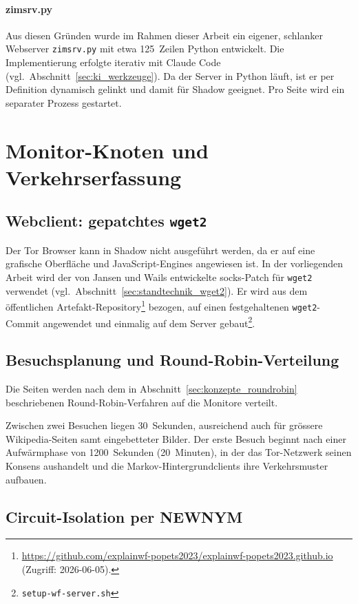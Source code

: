 \paragraph{zimsrv.py}
Aus diesen Gründen wurde im Rahmen dieser Arbeit ein eigener, schlanker Webserver \texttt{zimsrv.py} mit etwa 125~Zeilen Python entwickelt.
Die Implementierung erfolgte iterativ mit Claude Code (vgl.\ Abschnitt~\ref{sec:ki_werkzeuge}).
Da der Server in Python läuft, ist er per Definition dynamisch gelinkt und damit für Shadow geeignet.
Pro Seite wird ein separater Prozess gestartet.

\section{Monitor-Knoten und Verkehrserfassung}
\label{sec:realisierung_monitore}

\subsection{Webclient: gepatchtes \texttt{wget2}}

Der Tor Browser kann in Shadow nicht ausgeführt werden, da er auf eine grafische Oberfläche und JavaScript-Engines angewiesen ist.
In der vorliegenden Arbeit wird der von Jansen und Wails entwickelte \gls{socks}-Patch für \texttt{wget2} verwendet (vgl.\ Abschnitt~\ref{sec:standtechnik_wget2}).
Er wird aus dem öffentlichen Artefakt-Repository\footnote{\url{https://github.com/explainwf-popets2023/explainwf-popets2023.github.io} (Zugriff: 2026-06-05).} bezogen, auf einen festgehaltenen \texttt{wget2}-Commit angewendet und einmalig auf dem Server gebaut\footnote{\texttt{setup-wf-server.sh}}.

\subsection{Besuchsplanung und Round-Robin-Verteilung}
\label{sec:realisierung_schedule}

Die Seiten werden nach dem in Abschnitt~\ref{sec:konzepte_roundrobin} beschriebenen Round-Robin-Verfahren auf die Monitore verteilt.

Zwischen zwei Besuchen liegen 30~Sekunden, ausreichend auch für grössere Wikipedia-Seiten samt eingebetteter Bilder.
Der erste Besuch beginnt nach einer Aufwärmphase von 1200~Sekunden (20~Minuten), in der das Tor-Netzwerk seinen Konsens aushandelt und die Markov-Hintergrundclients ihre Verkehrsmuster aufbauen.

\subsection{Circuit-Isolation per NEWNYM}
\label{sec:realisierung_newnym}

